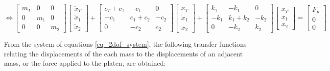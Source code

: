 \documentclass[9pt]{extarticle}
\begin{document}
\vspace{5mm}

\begin{equation*}
\Longleftrightarrow
\begin{bmatrix}
    m_T & 0 & 0 \\
    0 & m_1 & 0 \\
    0 & 0 & m_2
\end{bmatrix}
\begin{bmatrix}
    \ddot{x}_T \\ \ddot{x}_1 \\ \ddot{x}_2
\end{bmatrix}
+
\begin{bmatrix}
    c_T + c_1 & -c_1 & 0 \\
    -c_1 & c_1 + c_2 & -c_2 \\
    0 & -c_2 & c_2
\end{bmatrix}
\begin{bmatrix}
    \dot{x}_T \\ \dot{x}_1 \\ \dot{x}_2
\end{bmatrix}
+
\begin{bmatrix}
    k_1 & -k_1 & 0 \\
    -k_1 & k_1 + k_2 & -k_2 \\
    0 & -k_2 & k_2
\end{bmatrix}
\begin{bmatrix}
    x_T \\ x_1 \\ x_2
\end{bmatrix}
=
\begin{bmatrix}
    F_p \\ 0 \\ 0
\end{bmatrix}
\end{equation*}

    
\vspace{5mm}
From the system of equations \ref{eq_2dof_system}, the following transfer functions relating the displacements of the each mass to the displacements of an adjacent mass, or the force applied to the platen, are obtained:
\end{document}
